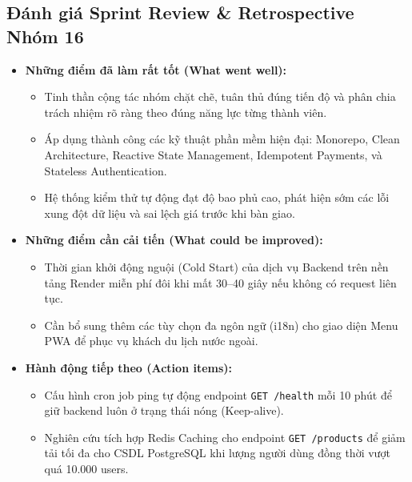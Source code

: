 \documentclass[a4paper]{article}
\begin{document}
\subsection{Đánh giá Sprint Review \& Retrospective Nhóm 16}
\begin{itemize}
    \item \textbf{Những điểm đã làm rất tốt (What went well):}
    \begin{itemize}
        \item Tinh thần cộng tác nhóm chặt chẽ, tuân thủ đúng tiến độ và phân chia trách nhiệm rõ ràng theo đúng năng lực từng thành viên.
        \item Áp dụng thành công các kỹ thuật phần mềm hiện đại: Monorepo, Clean Architecture, Reactive State Management, Idempotent Payments, và Stateless Authentication.
        \item Hệ thống kiểm thử tự động đạt độ bao phủ cao, phát hiện sớm các lỗi xung đột dữ liệu và sai lệch giá trước khi bàn giao.
    \end{itemize}
    \item \textbf{Những điểm cần cải tiến (What could be improved):}
    \begin{itemize}
        \item Thời gian khởi động nguội (Cold Start) của dịch vụ Backend trên nền tảng Render miễn phí đôi khi mất 30--40 giây nếu không có request liên tục.
        \item Cần bổ sung thêm các tùy chọn đa ngôn ngữ (i18n) cho giao diện Menu PWA để phục vụ khách du lịch nước ngoài.
    \end{itemize}
    \item \textbf{Hành động tiếp theo (Action items):}
    \begin{itemize}
        \item Cấu hình cron job ping tự động endpoint \texttt{GET /health} mỗi 10 phút để giữ backend luôn ở trạng thái nóng (Keep-alive).
        \item Nghiên cứu tích hợp Redis Caching cho endpoint \texttt{GET /products} để giảm tải tối đa cho CSDL PostgreSQL khi lượng người dùng đồng thời vượt quá 10.000 users.
    \end{itemize}
\end{itemize}
\end{document}
